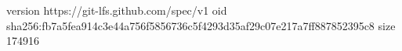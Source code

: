 version https://git-lfs.github.com/spec/v1
oid sha256:fb7a5fea914c3e44a756f5856736c5f4293d35af29c07e217a7ff887852395c8
size 174916
